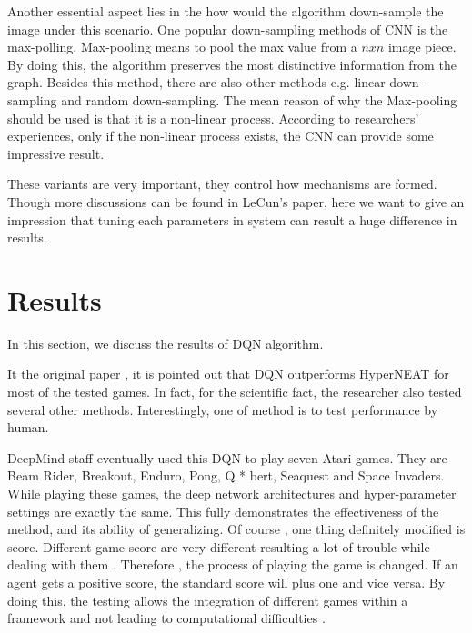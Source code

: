\documentclass{article}
\begin{document}
Another essential aspect lies in the how would the algorithm down-sample the image under this scenario. One popular down-sampling methods of CNN is the max-polling. Max-pooling means to pool the max value from a $n x n$ image piece. By doing this, the algorithm preserves the most distinctive information from the graph. Besides this method, there are also other methods e.g. linear down-sampling and random down-sampling. The mean reason of why the Max-pooling should be used is that it is a non-linear process. According to researchers' experiences\citep{lecun1998gradient}, only if the non-linear process exists, the CNN can provide some impressive result.

These variants are very important, they control how mechanisms are formed. Though more discussions can be found in LeCun's paper, here we want to give an impression that tuning each parameters in system can result a huge difference in results.

\section{Results}
In this section, we discuss the results of DQN algorithm. 

It the original paper \cite{mnih2013playing}, it is pointed out that DQN outperforms HyperNEAT for most of the tested games. In fact, for the scientific fact, the researcher also tested several other methods. Interestingly, one of method is to test performance by human.

DeepMind staff eventually used this DQN to play seven Atari games. They are Beam Rider, Breakout, Enduro, Pong, Q * bert, Seaquest and Space Invaders. While playing these games, the deep network architectures and hyper-parameter settings are exactly the same. This fully demonstrates the effectiveness of the method, and its ability of generalizing. Of course , one thing definitely modified is score. Different game score are very different resulting a lot of trouble while dealing with them . Therefore , the process of playing the game is changed. If an agent gets a positive score, the standard score will plus one and vice versa. By doing this, the testing allows the integration of different games within a framework and not leading to computational difficulties .
\end{document}
